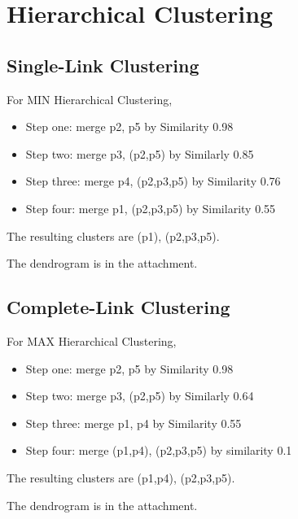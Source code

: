 \documentclass[11pt,a4paper]{article}
\begin{document}
\newpage
\section{Hierarchical Clustering}
\subsection{Single-Link Clustering}
For MIN Hierarchical Clustering,
\begin{itemize}
    \item{Step one: merge p2, p5 by Similarity 0.98}
    \item{Step two: merge p3, (p2,p5) by Similarly 0.85}
    \item{Step three: merge p4, (p2,p3,p5) by Similarity 0.76}
    \item{Step four: merge p1, (p2,p3,p5) by Similarity 0.55}
\end{itemize}

The resulting clusters are (p1), (p2,p3,p5). 

The dendrogram is in the attachment.

\subsection{Complete-Link Clustering}
For MAX Hierarchical Clustering,
\begin{itemize}
    \item{Step one: merge p2, p5 by Similarity 0.98}
    \item{Step two: merge p3, (p2,p5) by Similarly 0.64}
    \item{Step three: merge p1, p4 by Similarity 0.55}
    \item{Step four: merge (p1,p4), (p2,p3,p5) by similarity 0.1}
\end{itemize}

The resulting clusters are (p1,p4), (p2,p3,p5).

The dendrogram is in the attachment.

\end{document}
